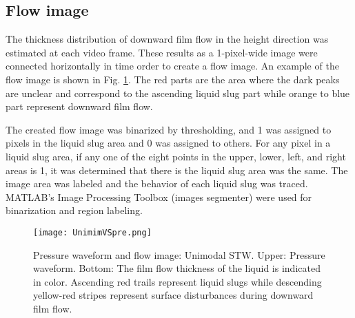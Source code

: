 \documentclass[aps,pre,preprint,groupedaddress,showkeys]{revtex4-2}
\begin{document}
\subsection{Flow image}\label{flowim}
The thickness distribution of downward film flow in the height direction was estimated at each video frame.
These results as a 1-pixel-wide image were connected horizontally in time order to create a flow image.
An example of the flow image is shown in Fig. \ref{UnimimVSpre}. 
The red parts are the area where the dark peaks are unclear and correspond to the ascending liquid slug part while orange to blue part represent downward film flow.

The created flow image was binarized by thresholding, and 1 was assigned to pixels in the liquid slug area and 0 was assigned to others.
For any pixel in a liquid slug area, if any one of the eight points in the upper, lower, left, and right areas is 1, it was determined that there is the liquid slug area was the same. 
The image area was labeled and the behavior of each liquid slug was traced.
MATLAB's Image Processing Toolbox (images segmenter) were used for binarization and region labeling.

\begin{figure}
\texttt{[image: UnimimVSpre.png]} 
\caption{\label{UnimimVSpre}Pressure waveform and flow image: Unimodal STW. Upper: Pressure waveform. Bottom: The film flow thickness of the liquid is indicated in color. Ascending red trails represent liquid slugs while descending yellow-red stripes represent surface disturbances during downward film flow.}
\end{figure} 
\end{document}
